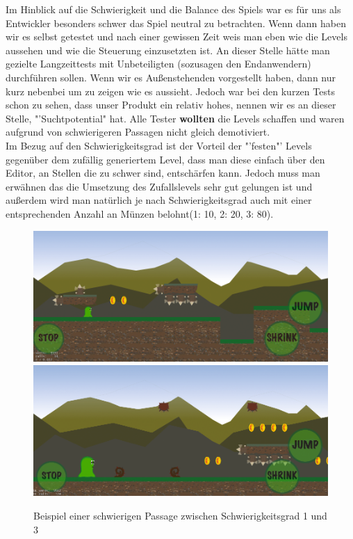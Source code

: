 Im Hinblick auf die Schwierigkeit und die Balance des Spiels war es für uns als Entwickler besonders schwer das Spiel neutral zu betrachten. Wenn dann haben wir es selbst getestet und nach einer gewissen Zeit weis man eben wie die Levels aussehen und wie die Steuerung einzusetzten ist. An dieser Stelle hätte man gezielte Langzeittests mit Unbeteiligten (sozusagen den Endanwendern) durchführen sollen. Wenn wir es Außenstehenden vorgestellt haben, dann nur kurz nebenbei um zu zeigen wie es aussieht.
Jedoch war bei den kurzen Tests schon zu sehen, dass unser Produkt ein relativ hohes, nennen wir es an dieser Stelle, "'Suchtpotential" hat. Alle Tester \textbf{wollten} die Levels schaffen und waren aufgrund von schwierigeren Passagen nicht gleich demotiviert.
\\Im Bezug auf den Schwierigkeitsgrad ist der Vorteil der "'festen"' Levels gegenüber dem zufällig generiertem Level, dass man diese einfach über den Editor, an Stellen die zu schwer sind, entschärfen kann. Jedoch muss man erwähnen das die Umsetzung des Zufallslevels sehr gut gelungen ist und außerdem wird man natürlich je nach Schwierigkeitsgrad auch mit einer entsprechenden Anzahl an Münzen belohnt(1: 10, 2: 20, 3: 80).

\begin{figure}[H]
\centering
\includegraphics[width=14cm]{resources/randomdiff1}
\\[0.5em]
\includegraphics[width=14cm]{resources/randomdiff3}
\caption{Beispiel einer schwierigen Passage zwischen Schwierigkeitsgrad 1 und 3}
\label{fig: randomdiff}
\end{figure}

